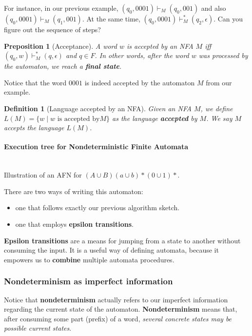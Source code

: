 \documentclass[a4paper, 12pt]{article}
\newtheorem*{theorem}{Definition}
\newtheorem*{lemma}{Preposition}
\begin{document}
For instance, in our previous example, $(q_0,0001)\vdash_M(q_0,001)$ and also $(q_0,0001)\vdash_M(q_1,001)$. At the same time, $(q_0,0001)\vdash_M^*(q_2,\epsilon)$. Can you figure out the sequence of steps?

\begin{lemma}[Acceptance]

A word $w$ is accepted by an NFA $M$ iff $(q_0,w)\vdash_M^*(q,\epsilon)$ and $q\in F$. In other words, after the word $w$ was processed by the automaton, we reach a \textbf{final state}.

\end{lemma}

Notice that the word $0001$ is indeed accepted by the automaton $M$ from our example.

\begin{theorem}[Language accepted by an NFA]

Given an NFA $M$, we define $L(M) = \{w\mid w\text{ is accepted by} M\}$ as the language \textbf{accepted} by $M$. We say $M$ accepts the language $L(M)$.

\end{theorem}

\paragraph{ Execution tree for Nondeterministic Finite Automata }\hfill\\

Illustration of an AFN for $(A\cup B)(a\cup b)*(0 \cup 1)*$.

There are two ways of writing this automaton:
  \begin{itemize}
  	\item  one that follows exactly our previous algorithm sketch.
  	\item  one that employs \textbf{epsilon transitions}.
  \end{itemize}

\textbf{Epsilon transitions} are a means for jumping from a state to another without consuming the input. It is a useful way of defining automata, because it empowers us to \textbf{combine} multiple automata procedures.


\subsubsection{ Nondeterminism as imperfect information }

Notice that \textbf{nondeterminism} actually refers to our imperfect information regarding the current state of the automaton. \textbf{Nondeterminism} means that, after consuming some part (prefix) of a word, \textit{several concrete states may be possible current states}.
\end{document}
